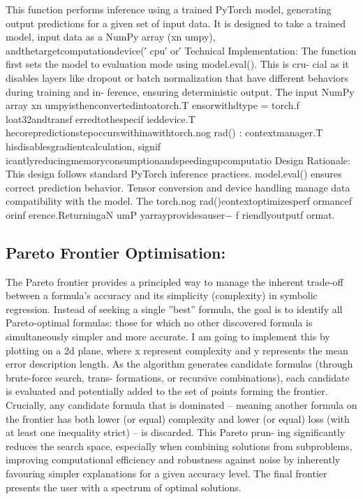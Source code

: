 \documentclass{article}
\begin{document}
{This function performs inference using a trained PyTorch model, generating output predictions for a given set of
input data. It is designed to take a trained model, input data as a NumPy array (xn umpy), andthetargetcomputationdevice(′ cpu′ or′
Technical Implementation: The function first sets the model to evaluation mode using model.eval(). This is cru-
cial as it disables layers like dropout or batch normalization that have different behaviors during training and in-
ference, ensuring deterministic output. The input NumPy array xn umpyisthenconvertedintoatorch.T ensorwithdtype =
torch.f loat32andtransf erredtothespecif ieddevice.T hecorepredictionstepoccurswithinawithtorch.nog rad() :
contextmanager.T hisdisablesgradientcalculation, signif icantlyreducingmemoryconsumptionandspeedingupcomputatio
Design Rationale: This design follows standard PyTorch inference practices. model.eval() ensures correct
prediction behavior. Tensor conversion and device handling manage data compatibility with the model. The torch.nog rad()contextoptimizesperf ormancef orinf erence.ReturningaN umP yarrayprovidesauser−
f riendlyoutputf ormat.\\ 


\subsection{Pareto Frontier Optimisation: }

The Pareto frontier provides a principled way to manage the inherent trade-off between a formula’s accuracy
and its simplicity (complexity) in symbolic regression. Instead of seeking a single ”best” formula, the goal is
to identify all Pareto-optimal formulas: those for which no other discovered formula is simultaneously simpler
and more accurate.
I am going to implement this by plotting on a 2d plane, where x represent complexity and y represents the mean
error description length. As the algorithm generates candidate formulas (through brute-force search, trans-
formations, or recursive combinations), each candidate is evaluated and potentially added to the set of points
forming the frontier.
Crucially, any candidate formula that is dominated – meaning another formula on the frontier has both lower (or
equal) complexity and lower (or equal) loss (with at least one inequality strict) – is discarded. This Pareto prun-
ing significantly reduces the search space, especially when combining solutions from subproblems, improving
computational efficiency and robustness against noise by inherently favouring simpler explanations for a given
accuracy level. The final frontier presents the user with a spectrum of optimal solutions.\\


}
\end{document}
